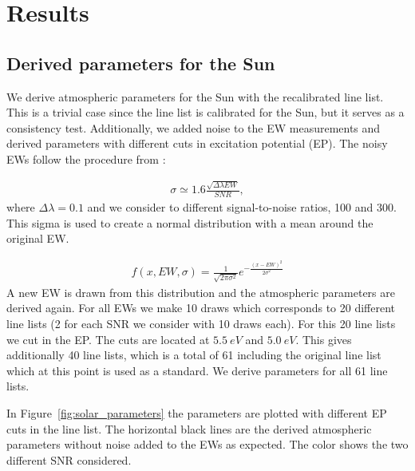 \documentclass{aa}
\begin{document}
\section{Results}
\label{sec:results}


\subsection{Derived parameters for the Sun}
\label{sec:derived_parameters_of_the_sun}

We derive atmospheric parameters for the Sun with the recalibrated line
list. This is a trivial case since the line list is calibrated for the
Sun, but it serves as a consistency test. Additionally, we added noise
to the EW measurements and derived parameters with different cuts in
excitation potential (EP). The noisy EWs follow the procedure from
\cite{Caryel1988}:

\begin{align}
    \sigma \simeq 1.6 \frac{\sqrt{\Delta\lambda EW}}{SNR},
\end{align}
where $\Delta\lambda=0.1$ and we consider to different signal-to-noise ratios,
100 and 300. This sigma is used to create a normal distribution with a mean
around the original EW.

\begin{align}
    f(x, EW, \sigma) = \frac{1}{\sqrt{2\pi\sigma^2}} e^{-\frac{(x-EW)^2}{2\sigma^2}}
\end{align}
A new EW is drawn from this distribution and the atmospheric parameters
are derived again. For all EWs we make 10 draws which corresponds to
20 different line lists (2 for each SNR we consider with 10 draws
each). For this 20 line lists we cut in the EP. The cuts are located
at $\SI{5.5}{eV}$ and $\SI{5.0}{eV}$. This gives additionally 40 line
lists, which is a total of 61 including the original line list which at
this point is used as a standard. We derive parameters for all 61 line
lists.


In Figure~\ref{fig:solar_parameters} the parameters are plotted with
different EP cuts in the line list. The horizontal black lines are
the derived atmospheric parameters without noise added to the EWs as
expected. The color shows the two different SNR considered.
\end{document}
